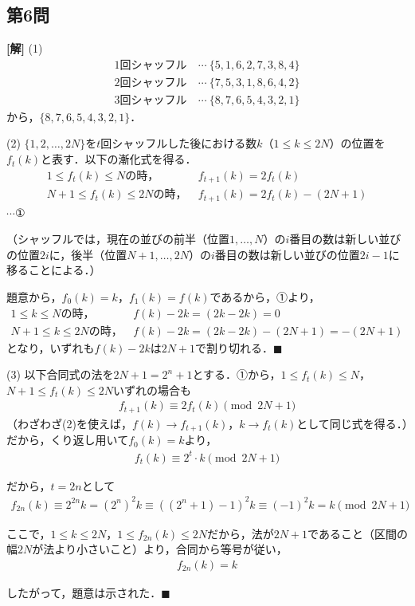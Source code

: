 \documentclass[../main.tex]{subfiles}
\begin{document}
\bigskip

\subsection*{第6問}

\noindent
{\bf [解]}
(1)
\begin{align*}
  1\text{回シャッフル}&\ \cdots\ \{5,1,6,2,7,3,8,4\}\\
  2\text{回シャッフル}&\ \cdots\ \{7,5,3,1,8,6,4,2\}\\
  3\text{回シャッフル}&\ \cdots\ \{8,7,6,5,4,3,2,1\}
\end{align*}
から，$\{8,7,6,5,4,3,2,1\}$．

(2) $\{1,2,\ldots,2N\}$を$t$回シャッフルした後における数$k$（$1\le k\le2N$）の位置を$f_t(k)$と表す．以下の漸化式を得る．
\begin{align*}
  1\le f_t(k)\le N\text{の時，}&\ f_{t+1}(k)=2f_t(k)\\
  N+1\le f_t(k)\le2N\text{の時，}&\ f_{t+1}(k)=2f_t(k)-(2N+1)
\end{align*}
$\cdots①$

（シャッフルでは，現在の並びの前半（位置$1,\ldots,N$）の$i$番目の数は新しい並びの位置$2i$に，後半（位置$N+1,\ldots,2N$）の$i$番目の数は新しい並びの位置$2i-1$に移ることによる．）

題意から，$f_0(k)=k$，$f_1(k)=f(k)$であるから，①より，
\begin{align*}
  1\le k\le N\text{の時，}&\ f(k)-2k=(2k-2k)=0\\
  N+1\le k\le2N\text{の時，}&\ f(k)-2k=(2k-2k)-(2N+1)=-(2N+1)
\end{align*}
となり，いずれも$f(k)-2k$は$2N+1$で割り切れる．$\blacksquare$

(3) 以下合同式の法を$2N+1=2^n+1$とする．①から，$1\le f_t(k)\le N$，$N+1\le f_t(k)\le2N$いずれの場合も
\begin{align*}
  f_{t+1}(k)\equiv2f_t(k)\pmod{2N+1}
\end{align*}
（わざわざ(2)を使えば，$f(k)\to f_{t+1}(k)$，$k\to f_t(k)$として同じ式を得る．）だから，くり返し用いて$f_0(k)=k$より，
\begin{align*}
  f_t(k)\equiv2^t\cdot k\pmod{2N+1}
\end{align*}

だから，$t=2n$として
\begin{align*}
  f_{2n}(k)\equiv2^{2n}k=\left(2^n\right)^2k\equiv\left((2^n+1)-1\right)^2k\equiv(-1)^2k=k\pmod{2N+1}
\end{align*}

ここで，$1\le k\le2N$，$1\le f_{2n}(k)\le2N$だから，法が$2N+1$であること（区間の幅$2N$が法より小さいこと）より，合同から等号が従い，
\begin{align*}
  f_{2n}(k)=k
\end{align*}

したがって，題意は示された．$\blacksquare$
\end{document}
